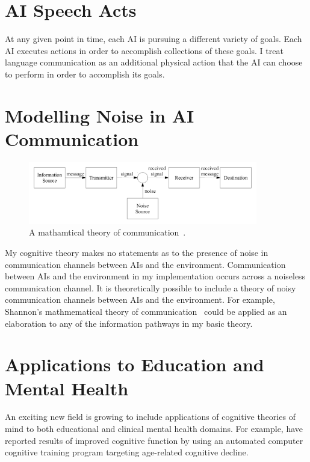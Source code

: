 \section{AI Speech Acts}

At any given point in time, each AI is pursuing a different variety
of goals.  Each AI executes actions in order to accomplish
collections of these goals.  I treat language communication as an
additional physical action that the AI can choose to perform in
order to accomplish its goals.

\section{Modelling Noise in AI Communication}

\begin{figure}[bth]
  \center
  \includegraphics[width=10cm]{gfx/communication_theory}
  \caption[A mathematical theory of communication]{A mathamtical
    theory of communication~\citep{shannon:1959}.}
  \label{fig:communication_theory}
\end{figure}

My cognitive theory makes no statements as to the presence of noise
in communication channels between AIs and the environment.
Communication between AIs and the environment in my implementation
occurs across a noiseless communication channel.  It is theoretically
possible to include a theory of noisy communication channels between
AIs and the environment.  For example, Shannon's mathmematical
theory of communication~\citep{shannon:1959} could be applied as an
elaboration to any of the information pathways in my basic theory.


%
%

\section{Applications to Education and Mental Health}

An exciting new field is growing to include applications of cognitive
theories of mind to both educational and clinical mental health
domains.  For example, \cite{mahncke:2006} have reported results of
improved cognitive function by using an automated computer cognitive
training program targeting age-related cognitive decline.



